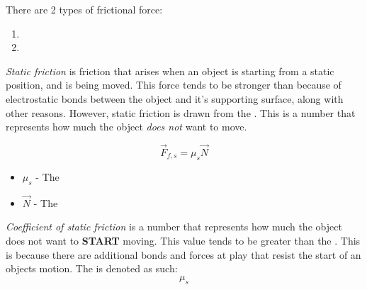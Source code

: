 There are 2 types of frictional force:
\begin{enumerate}
  \item {}
  \item {}
\end{enumerate}

\begin{definition}\label{def:Static Friction}
  \emph{Static friction} is friction that arises when an object is starting from a static position, and is being moved.
  This force tends to be stronger than  because of electrostatic bonds between the object and it's supporting surface, along with other reasons.
  However, static friction is drawn from the .
  This is a  number that represents how much the object \emph{does not} want to move.

  \begin{equation}\label{eq:Static Friction}
    \vec{F}_{f,s} = \mu_{s} \vec{N}
  \end{equation}
  \begin{itemize}[noitemsep, nolistsep]
    \item $\mu_{s}$ - The 
    \item $\vec{N}$ - The 
  \end{itemize}
\end{definition}

\begin{definition}\label{def:Coefficient of Static Friction}
  \emph{Coefficient of static friction} is a  number that represents how much the object does not want to \textbf{START} moving.
  This value tends to be greater than the .
  This is because there are additional bonds and forces at play that resist the start of an objects motion.
  The  is denoted as such:
  \begin{equation}\label{eq:Coefficient of Static Friction}
    \mu_{s}
  \end{equation}
\end{definition}

